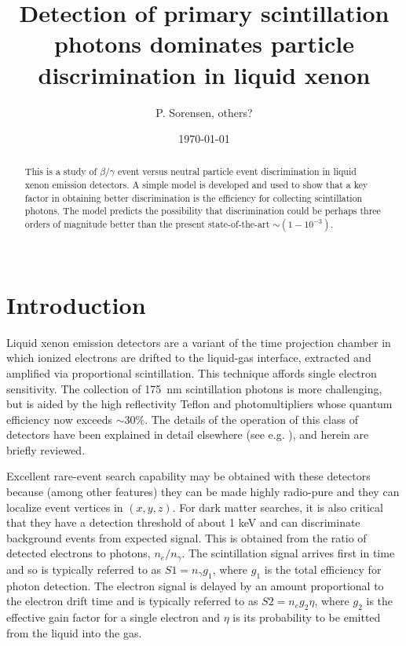 \documentclass[article]{revtex4-1}[11pt]
\begin{document}
 


\title{Detection of primary scintillation photons dominates particle discrimination in liquid xenon}
\author{P. Sorensen, others?}
 
\begin{abstract}
This is a study of $\beta/\gamma$ event versus neutral particle event discrimination in liquid xenon emission detectors. A simple model is developed and used to show that a key factor in obtaining better discrimination is the efficiency for collecting scintillation photons. The model predicts the possibility that discrimination could be perhaps three orders of magnitude better than the present state-of-the-art $\sim(1-10^{-3})$. 
\\
\\
\end{abstract}
\date{\today}

\maketitle


\section{{Introduction}}\label{sec:intro}
Liquid xenon emission detectors are a variant of the time projection chamber in which ionized electrons are drifted to the liquid-gas interface, extracted and amplified via proportional scintillation. This technique affords single electron sensitivity. The collection of 175~nm scintillation photons is more challenging, but is aided by the high reflectivity Teflon and photomultipliers whose quantum efficiency now exceeds $\sim30\%$. The details of the operation of this class of detectors have been explained in detail elsewhere (see e.g. \cite{}), and herein are briefly reviewed. 

Excellent rare-event search capability may be obtained with these detectors because (among other features) they can be made highly radio-pure and they can localize event vertices in $(x,y,z)$. For dark matter searches, it is also critical that they have a detection threshold of about 1 keV and can discriminate background events from expected signal. This is obtained from the ratio of detected electrons to photons, $n_e/n_{\gamma}$. The scintillation signal arrives first in time and so is typically referred to as $S1 = n_{\gamma} g_1$, where $g_1$ is the total efficiency for photon detection. The electron signal is delayed by an amount proportional to the electron drift time and is typically referred to as $S2=n_e g_2 \eta$, where $g_2$ is the effective gain factor for a single electron and $\eta$ is its probability to be emitted from the liquid into the gas. 
\end{document}

